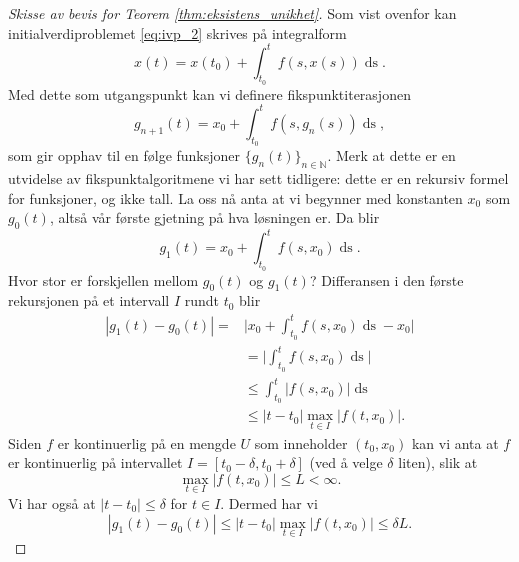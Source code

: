 \documentclass{article}
\theoremstyle{plain}
\theoremstyle{definition}
\theoremstyle{remark}
\newcommand{\diff}[1]{\mathop{d#1}}
\newcommand{\fcn}{x}
\newcommand{\abs}[1]{|#1|}
\newcommand{\bigabs}[1]{\big|#1\big|}
\newcommand{\biggabs}[1]{\bigg|#1\bigg|}
\begin{document}
\begin{proof}[Skisse av bevis for Teorem \ref{thm:eksistens_unikhet}]
    Som vist ovenfor kan initialverdiproblemet \eqref{eq:ivp_2} skrives på integralform
    \begin{equation*}
        x(t) = x(t_0) + \int_{t_0}^t f(s, x(s)) \diff{s}.
    \end{equation*}
    Med dette som utgangspunkt kan vi definere fikspunktiterasjonen
    \begin{equation}
        g_{n+1}(t) = \fcn_0 + \int_{t_0}^{t} f(s, g_n(s)) \diff{s},
    \end{equation}
    som gir opphav til en følge funksjoner $\{g_n(t)\}_{n \in \mathbb{N}}$. Merk at dette er en utvidelse av fikspunktalgoritmene vi har sett tidligere: dette er en rekursiv formel for funksjoner, og ikke tall. La oss nå anta at vi begynner med konstanten $x_0$ som $g_0(t)$, altså vår første gjetning på hva løsningen er. Da blir
    \begin{equation*}
        g_1(t) = \fcn_0 + \int_{t_0}^{t} f(s, x_0) \diff{s}.
    \end{equation*}
    Hvor stor er forskjellen mellom $g_0(t)$ og $g_1(t)$? Differansen i den første rekursjonen på et intervall $I$ rundt $t_0$ blir
    \begin{equation*}
        \begin{aligned}
            \abs{g_1(t) - g_0(t)} = & \biggabs{x_0 + \int_{t_0}^{t} f(s, x_0) \diff{s} - x_0} \\
            & = \biggabs{ \int_{t_0}^{t} f(s, x_0) \diff{s} } \\
            & \leq \int_{t_0}^{t} \abs{f(s, x_0)} \diff{s} \\
            & \leq \abs{t - t_0} \max_{t \in I} \bigabs{f(t, x_0)}.
        \end{aligned}
    \end{equation*}
    Siden $f$ er kontinuerlig på en mengde $U$ som inneholder $(t_0, x_0)$ kan vi anta at $f$ er kontinuerlig på intervallet $I = [t_0 - \delta, t_0 + \delta]$ (ved å velge $\delta$ liten), slik at
    \begin{equation*}
        \max_{t \in I} \bigabs{f(t, x_0)} \leq L < \infty.
    \end{equation*}
    Vi har også at $\abs{t - t_0} \leq \delta$ for $t \in I$. Dermed har vi
    \begin{equation} \label{eq:første_diff}
        \abs{g_1(t) - g_0(t)} \leq \abs{t - t_0} \max_{t \in I} \bigabs{f(t, x_0)} \leq \delta L.
    \end{equation}

\end{proof}
\end{document}
